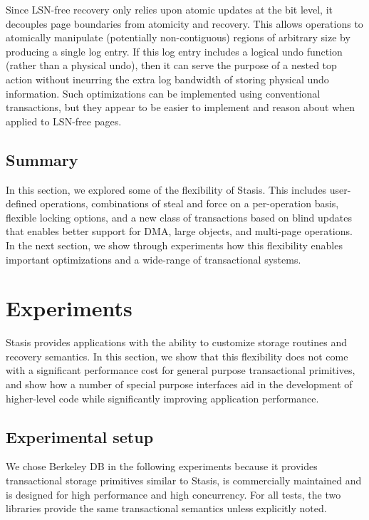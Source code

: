 \documentclass[letterpaper,twocolumn,10pt]{article}
\newcommand{\yad}{Stasis\xspace}
\begin{document}
Since LSN-free recovery only relies upon atomic updates at the bit
level, it decouples page boundaries from atomicity and recovery.  This
allows operations to atomically manipulate (potentially
non-contiguous) regions of arbitrary size by producing a single log
entry.  If this log entry includes a logical undo function (rather
than a physical undo), then it can serve the purpose of a nested top
action without incurring the extra log bandwidth of storing physical
undo information.  Such optimizations can be implemented using
conventional transactions, but they appear to be easier to implement
and reason about when applied to LSN-free pages.

\subsection{Summary}

In this section, we explored some of the flexibility of \yad. This
includes user-defined operations, combinations of steal and force on
a per-operation basis, flexible locking options, and a new class of
transactions based on blind updates that enables better support for
DMA, large objects, and multi-page operations.  In the next section,
we show through experiments how this flexibility enables important
optimizations and a wide-range of transactional systems.




\section{Experiments}
\label{experiments}

\yad provides applications with the ability to customize storage
routines and recovery semantics.  In this section, we show that this
flexibility does not come with a significant performance cost for
general purpose transactional primitives, and show how a number of
special purpose interfaces aid in the development of higher-level 
code while significantly improving application performance.

\subsection{Experimental setup}
\label{sec:experimental_setup}

We chose Berkeley DB in the following experiments because
it provides transactional storage primitives
similar to \yad, is 
commercially maintained and is designed for high performance and high
concurrency.  For all tests, the two libraries provide the same
transactional semantics unless explicitly noted.
\end{document}
